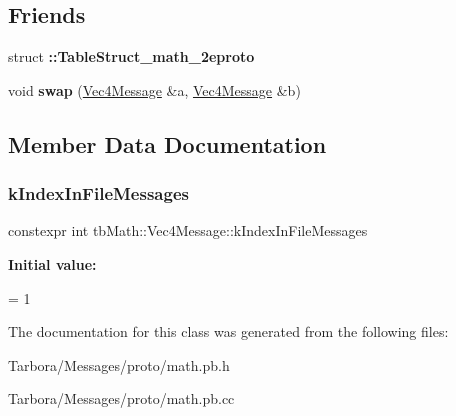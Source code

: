 \subsection*{Friends}
\begin{DoxyCompactItemize}
\item 
\mbox{\label{classtbMath_1_1Vec4Message_a016291c3138deb3d18455a730e2da9b1}} 
struct {\bfseries \+::\+Table\+Struct\+\_\+math\+\_\+2eproto}
\item 
\mbox{\label{classtbMath_1_1Vec4Message_a69c6b5fd404a774149c56f7e4f7b9507}} 
void {\bfseries swap} (\hyperlink{classtbMath_1_1Vec4Message}{Vec4\+Message} \&a, \hyperlink{classtbMath_1_1Vec4Message}{Vec4\+Message} \&b)
\end{DoxyCompactItemize}


\subsection{Member Data Documentation}
\mbox{\label{classtbMath_1_1Vec4Message_a7865e9bcb7820eb8b12e98e4e907375a}} 
\subsubsection{\texorpdfstring{k\+Index\+In\+File\+Messages}{kIndexInFileMessages}}
{\footnotesize\ttfamily constexpr int tb\+Math\+::\+Vec4\+Message\+::k\+Index\+In\+File\+Messages\hspace{0.3cm}{\ttfamily [static]}}

{\bfseries Initial value\+:}
\begin{DoxyCode}
=
    1
\end{DoxyCode}


The documentation for this class was generated from the following files\+:\begin{DoxyCompactItemize}
\item 
Tarbora/\+Messages/proto/math.\+pb.\+h\item 
Tarbora/\+Messages/proto/math.\+pb.\+cc\end{DoxyCompactItemize}
